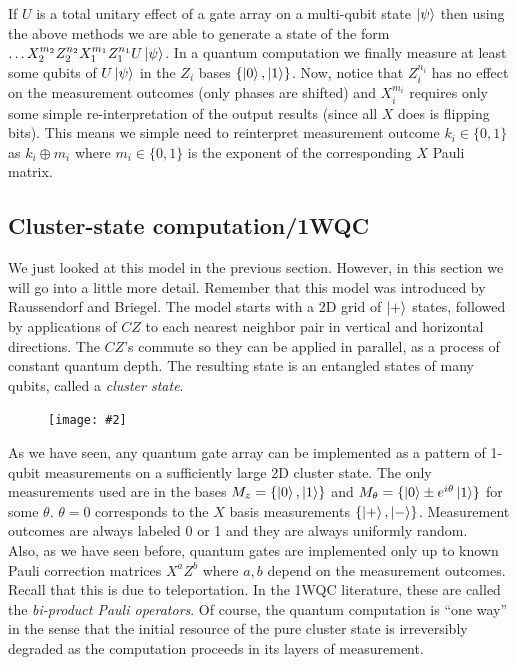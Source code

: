 \documentclass{book}
\theoremstyle{definition}
\newcommand{\fig}[2]{
	\begin{figure}[!htb]
		\centering
		\texttt{[image: \#2]}
	\end{figure}}
\begin{document}
If $U$ is a total unitary effect of a gate array on a multi-qubit state $\ket{\psi}$ then using the above methods we are able to generate a state of the form $\dots X_2^{m_2}Z_2^{n_2}X_1^{m_1}Z_1^{n_1} U \ket{\psi}$. In a quantum computation we finally measure at least some qubits of $U\ket{\psi}$ in the $Z_i$ bases $\{ \ket{0}, \ket{1} \}$. Now, notice that $Z_i^{n_i}$ has no effect on the measurement outcomes (only phases are shifted) and $X_i^{m_i}$ requires only some simple re-interpretation of the output results (since all $X$ does is flipping bits). This means we simple need to reinterpret measurement outcome $k_i \in \{0,1\}$ as $k_i \oplus m_i$ where $m_i \in \{0,1\}$ is the exponent of the corresponding $X$ Pauli matrix. 





\subsection{Cluster-state computation/1WQC}

We just looked at this model in the previous section. However, in this section we will go into a little more detail. Remember that this model was introduced by Raussendorf and Briegel. The model starts with a 2D grid of $\ket{+}$ states, followed by applications of $CZ$ to each nearest neighbor pair in vertical and horizontal directions. The $CZ$'s commute so they can be applied in parallel, as a process of constant quantum depth. The resulting state is an entangled states of many qubits, called a \textit{cluster state}.

\fig{0.3}{jozsa1}

As we have seen, any quantum gate array can be implemented as a pattern of 1-qubit measurements on a sufficiently large 2D cluster state. The only measurements used are in the bases $M_z = \{\ket{0}, \ket{1}\}$ and $M_\theta = \{ \ket{0} \pm e^{i\theta}\ket{1} \}$ for some $\theta$. $\theta = 0$ corresponds to the $X$ basis measurements $\{ \ket{+}, \ket{-}   \}$. Measurement outcomes are always labeled 0 or 1 and they are always uniformly random.  \\

Also, as we have seen before, quantum gates are implemented only up to known Pauli correction matrices $X^a Z^b$ where $a,b$ depend on the measurement outcomes. Recall that this is due to teleportation. In the 1WQC literature, these are called the \textit{bi-product Pauli operators}. Of course, the quantum computation is ``one way'' in the sense that the initial resource of the pure cluster state is irreversibly degraded as the computation proceeds in its layers of measurement. 
\end{document}
